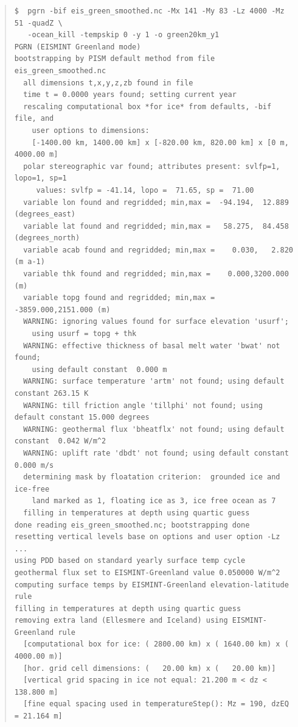 \documentclass[11pt,final]{amsart}
\begin{document}
\begin{table}\label{bootstrapEISgreen}
\scriptsize
\begin{quote}
\begin{verbatim}
$  pgrn -bif eis_green_smoothed.nc -Mx 141 -My 83 -Lz 4000 -Mz 51 -quadZ \
   -ocean_kill -tempskip 0 -y 1 -o green20km_y1
PGRN (EISMINT Greenland mode)
bootstrapping by PISM default method from file eis_green_smoothed.nc
  all dimensions t,x,y,z,zb found in file
  time t = 0.0000 years found; setting current year
  rescaling computational box *for ice* from defaults, -bif file, and
    user options to dimensions:
    [-1400.00 km, 1400.00 km] x [-820.00 km, 820.00 km] x [0 m, 4000.00 m]
  polar stereographic var found; attributes present: svlfp=1, lopo=1, sp=1
     values: svlfp = -41.14, lopo =  71.65, sp =  71.00
  variable lon found and regridded; min,max =  -94.194,  12.889 (degrees_east)
  variable lat found and regridded; min,max =   58.275,  84.458 (degrees_north)
  variable acab found and regridded; min,max =    0.030,   2.820 (m a-1)
  variable thk found and regridded; min,max =    0.000,3200.000 (m)
  variable topg found and regridded; min,max = -3859.000,2151.000 (m)
  WARNING: ignoring values found for surface elevation 'usurf';
    using usurf = topg + thk
  WARNING: effective thickness of basal melt water 'bwat' not found;
    using default constant  0.000 m
  WARNING: surface temperature 'artm' not found; using default constant 263.15 K
  WARNING: till friction angle 'tillphi' not found; using default constant 15.000 degrees
  WARNING: geothermal flux 'bheatflx' not found; using default constant  0.042 W/m^2
  WARNING: uplift rate 'dbdt' not found; using default constant  0.000 m/s
  determining mask by floatation criterion:  grounded ice and ice-free
    land marked as 1, floating ice as 3, ice free ocean as 7
  filling in temperatures at depth using quartic guess
done reading eis_green_smoothed.nc; bootstrapping done
resetting vertical levels base on options and user option -Lz ...
using PDD based on standard yearly surface temp cycle
geothermal flux set to EISMINT-Greenland value 0.050000 W/m^2
computing surface temps by EISMINT-Greenland elevation-latitude rule
filling in temperatures at depth using quartic guess
removing extra land (Ellesmere and Iceland) using EISMINT-Greenland rule
  [computational box for ice: ( 2800.00 km) x ( 1640.00 km) x ( 4000.00 m)]
  [hor. grid cell dimensions: (   20.00 km) x (   20.00 km)]
  [vertical grid spacing in ice not equal: 21.200 m < dz < 138.800 m]
  [fine equal spacing used in temperatureStep(): Mz = 190, dzEQ = 21.164 m]

\end{verbatim}
\end{quote}
\end{table}
\end{document}
